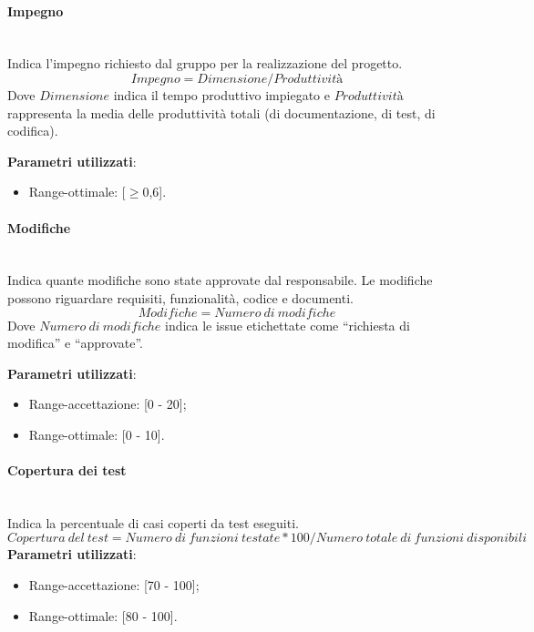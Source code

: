 			\paragraph{Impegno} \mbox{} \\

			Indica l'impegno richiesto dal gruppo per la realizzazione del progetto.
			\[
			Impegno = Dimensione / Produttività
			\]
			Dove $Dimensione$ indica il tempo produttivo impiegato e $Produttività$ rappresenta la media delle produttività totali (di documentazione, di test, di codifica).

			\textbf{Parametri utilizzati}:
			\begin{itemize}
				\item Range-ottimale: [$\ge$0,6].
			\end{itemize}

			\paragraph{Modifiche} \mbox{} \\

			Indica quante modifiche sono state approvate dal responsabile. Le modifiche possono riguardare requisiti, funzionalità, codice e documenti.
			\[
			Modifiche = Numero\ di\ modifiche
			\]
			Dove $Numero\ di\ modifiche$ indica le issue etichettate come ``richiesta di modifica'' e ``approvate''.

			\textbf{Parametri utilizzati}:
			\begin{itemize}
				\item Range-accettazione: [0 - 20];
				\item Range-ottimale: [0 - 10].
			\end{itemize}

			\paragraph{Copertura dei test} \mbox{} \\

			Indica la percentuale di casi coperti da test eseguiti.
			\[
			Copertura\ del\ test = Numero\ di\ funzioni\ testate * 100 / Numero\ totale\ di\ funzioni\ disponibili
			\]
			\textbf{Parametri utilizzati}:
			\begin{itemize}
				\item Range-accettazione: [70 - 100];
				\item Range-ottimale: [80 - 100].
			\end{itemize}
			
